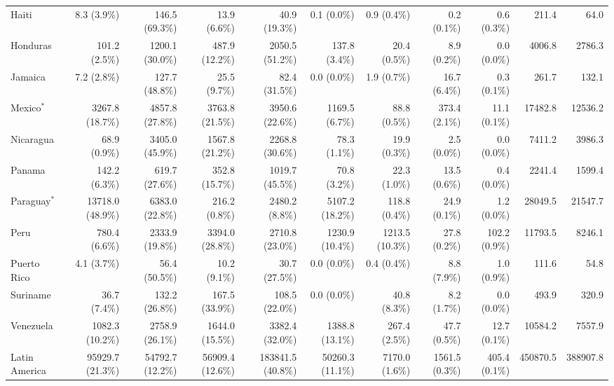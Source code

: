 \begin{scriptsize}
\begin{landscape}
\begin{center}
\begin{longtable}[ht]{lrrrrrrrrrr}
			Haiti&8.3 (3.9\%)&146.5 (69.3\%)&13.9 (6.6\%)&40.9 (19.3\%)&0.1 (0.0\%)&0.9 (0.4\%)&0.2 (0.1\%)&0.6 (0.3\%)&211.4&64.0\\
			Honduras&101.2 (2.5\%)&1200.1 (30.0\%)&487.9 (12.2\%)&2050.5 (51.2\%)&137.8 (3.4\%)&20.4 (0.5\%)&8.9 (0.2\%)&0.0 (0.0\%)&4006.8&2786.3\\
			Jamaica&7.2 (2.8\%)&127.7 (48.8\%)&25.5 (9.7\%)&82.4 (31.5\%)&0.0 (0.0\%)&1.9 (0.7\%)&16.7 (6.4\%)&0.3 (0.1\%)&261.7&132.1\\
			Mexico$^*$&3267.8 (18.7\%)&4857.8 (27.8\%)&3763.8 (21.5\%)&3950.6 (22.6\%)&1169.5 (6.7\%)&88.8 (0.5\%)&373.4 (2.1\%)&11.1 (0.1\%)&17482.8&12536.2\\
			Nicaragua&68.9 (0.9\%)&3405.0 (45.9\%)&1567.8 (21.2\%)&2268.8 (30.6\%)&78.3 (1.1\%)&19.9 (0.3\%)&2.5 (0.0\%)&0.0 (0.0\%)&7411.2&3986.3\\
			Panama&142.2 (6.3\%)&619.7 (27.6\%)&352.8 (15.7\%)&1019.7 (45.5\%)&70.8 (3.2\%)&22.3 (1.0\%)&13.5 (0.6\%)&0.4 (0.0\%)&2241.4&1599.4\\
			Paraguay$^*$&13718.0 (48.9\%)&6383.0 (22.8\%)&216.2 (0.8\%)&2480.2 (8.8\%)&5107.2 (18.2\%)&118.8 (0.4\%)&24.9 (0.1\%)&1.2 (0.0\%)&28049.5&21547.7\\
			Peru&780.4 (6.6\%)&2333.9 (19.8\%)&3394.0 (28.8\%)&2710.8 (23.0\%)&1230.9 (10.4\%)&1213.5 (10.3\%)&27.8 (0.2\%)&102.2 (0.9\%)&11793.5&8246.1\\
			Puerto Rico&4.1 (3.7\%)&56.4 (50.5\%)&10.2 (9.1\%)&30.7 (27.5\%)&0.0 (0.0\%)&0.4 (0.4\%)&8.8 (7.9\%)&1.0 (0.9\%)&111.6&54.8\\
			Suriname&36.7 (7.4\%)&132.2 (26.8\%)&167.5 (33.9\%)&108.5 (22.0\%)&0.0 (0.0\%)&40.8 (8.3\%)&8.2 (1.7\%)&0.0 (0.0\%)&493.9&320.9\\
			Venezuela&1082.3 (10.2\%)&2758.9 (26.1\%)&1644.0 (15.5\%)&3382.4 (32.0\%)&1388.8 (13.1\%)&267.4 (2.5\%)&47.7 (0.5\%)&12.7 (0.1\%)&10584.2&7557.9\\\hline
			Latin America&95929.7 (21.3\%)&54792.7 (12.2\%)&56909.4 (12.6\%)&183841.5 (40.8\%)&50260.3 (11.1\%)&7170.0 (1.6\%)&1561.5 (0.3\%)&405.4 (0.1\%)&450870.5&388907.8\\\hline


\end{longtable}
\end{center}
\end{landscape}
\end{scriptsize}
